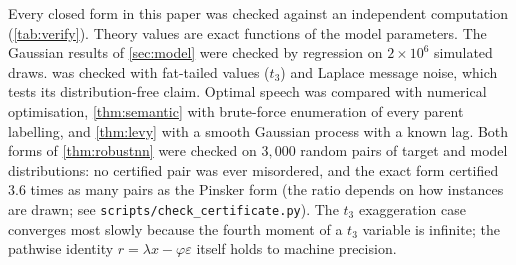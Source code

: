 \documentclass[11pt,a4paper]{article}
\theoremstyle{plain}
\theoremstyle{definition}
\theoremstyle{remark}
\begin{document}
Every closed form in this paper was checked against an independent computation (\cref{tab:verify}). Theory values are exact functions of the model parameters. The Gaussian results of \cref{sec:model} were checked by regression on $2\times10^6$ simulated draws.  was checked with fat-tailed values ($t_3$) and Laplace message noise, which tests its distribution-free claim. Optimal speech was compared with numerical optimisation, \cref{thm:semantic} with brute-force enumeration of every parent labelling, and \cref{thm:levy} with a smooth Gaussian process with a known lag. Both forms of \cref{thm:robustnn} were checked on $3{,}000$ random pairs of target and model distributions: no certified pair was ever misordered, and the exact form certified $3.6$ times as many pairs as the Pinsker form (the ratio depends on how instances are drawn; see \texttt{scripts/check\_certificate.py}). The $t_3$ exaggeration case converges most slowly because the fourth moment of a $t_3$ variable is infinite; the pathwise identity $r=\lambda x-\varphi\varepsilon$ itself holds to machine precision.
\end{document}
